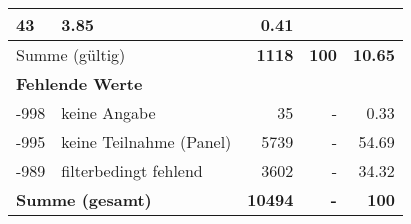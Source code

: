 \begin{longtable}{lXrrr}
       \num{43} &
       \num[round-mode=places,round-precision=2]{3,85} &
         \num[round-mode=places,round-precision=2]{0,41} \\
     \midrule
     \multicolumn{2}{l}{Summe (gültig)} &
       \textbf{\num{1118}} &
     \textbf{100} &
       \textbf{\num[round-mode=places,round-precision=2]{10,65}} \\
     \multicolumn{5}{l}{\textbf{Fehlende Werte}}\\
       -998 &
       keine Angabe &
         \num{35} &
        - &
         \num[round-mode=places,round-precision=2]{0,33} \\
       -995 &
       keine Teilnahme (Panel) &
         \num{5739} &
        - &
         \num[round-mode=places,round-precision=2]{54,69} \\
       -989 &
       filterbedingt fehlend &
         \num{3602} &
        - &
         \num[round-mode=places,round-precision=2]{34,32} \\
     \midrule
     \multicolumn{2}{l}{\textbf{Summe (gesamt)}} &
          \textbf{\num{10494}} &
        \textbf{-} &
        \textbf{100} \\
     \bottomrule
     \end{longtable}
     
